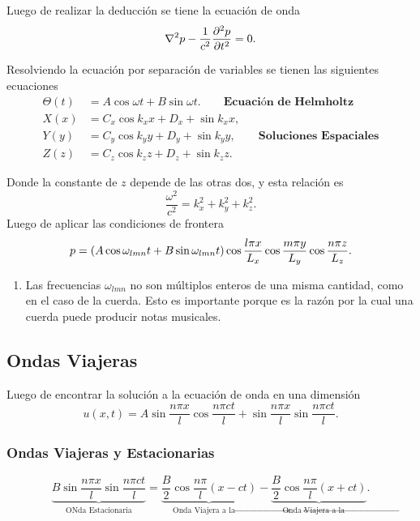 Luego de realizar la deducción se tiene la ecuación de onda
\begin{equation}
	\laplacian{p} - \frac{1}{c^2} \pdv[2]{p}{t} = 0.
\end{equation}

Resolviendo la ecuación por separación de variables se tienen las siguientes ecuaciones
\begin{align}
	\Theta (t) &= A \cos{\omega t} + B \sin{\omega t}. \qquad \textbf{Ecuación de Helmholtz} \\
	X(x) &= C_x \cos{k_x x} + D_x + \sin{k_x x}, \\
	Y(y) &= C_y \cos{k_y y} + D_y + \sin{k_y y}, \qquad \textbf{Soluciones Espaciales} \\
	Z(z) &= C_z \cos{k_z z} + D_z + \sin{k_z z}.
\end{align}

Donde la constante de $z$ depende de las otras dos, y esta relación es
\begin{equation}
	\frac{\omega ^2}{c^2} = k_x ^2 + k_y ^2 + k_z ^2.
\end{equation}
Luego de aplicar las condiciones de frontera 
\begin{equation}
	p = \qty(A \cos{\omega _{lmn} t} + B \sin{\omega _{lmn} t}) \cos{\frac{l\pi x}{L_x}} \cos{\frac{m\pi y}{L_y}} \cos{\frac{n\pi z}{L_z}}.
\end{equation}

\begin{enumerate}
	\item Las frecuencias $\omega _{lmn}$ no son múltiplos enteros de una misma cantidad, como en el caso de la cuerda. Esto es importante porque es la razón por la cual una cuerda puede producir notas musicales.
\end{enumerate}

\subsection{Ondas Viajeras}
Luego de encontrar la solución a la ecuación de onda en una dimensión
\begin{equation}
	u(x,t) = A \sin{\frac{n\pi x}{l}} \cos{\frac{n\pi ct}{l}} + \sin{\frac{n\pi x}{l}} \sin{\frac{n\pi ct}{l}}.
\end{equation}


\subsubsection{Ondas Viajeras y Estacionarias}
\begin{equation}
	\underbrace{B \sin{\frac{n\pi x}{l}} \sin{\frac{n\pi ct}{l}}}_{\text{ONda Estacionaria}} = \underbrace{\frac{B}{2} \cos{\frac{n\pi}{l} (x - ct)}}_{\text{Onda Viajera a la }\to} - \underbrace{\frac{B}{2} \cos{\frac{n\pi}{l} (x + ct)}}_{\text{Onda Viajera a la } \leftarrow}.
\end{equation}

